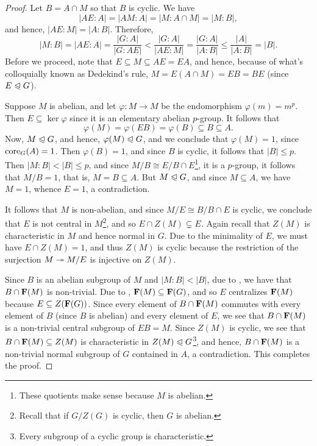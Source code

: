 \begin{proof}
    Let $B = A\cap M$ so that $B$ is cyclic. We have 
    \begin{equation*}
        |AE : A| = |AM : A| = |M : A\cap M| = |M : B|,
    \end{equation*}
    and hence, $|AE : M| = |A : B|$. Therefore, 
    \begin{equation*}
        |M : B| = |AE : A| = \frac{|G : A|}{|G : AE|} < \frac{|G : A|}{|AE : M|} = \frac{|G : A|}{|A : B|}\le\frac{|A|}{|A : B|} = |B|.
    \end{equation*}
    Before we proceed, note that $E\subseteq M\subseteq AE = EA$, and hence, because of what's colloquially known as Dedekind's rule, $M = E(A\cap M) = EB = BE$ (since $E\trianglelefteqslant G$).

    Suppose $M$ is abelian, and let $\varphi: M\to M$ be the endomorphism $\varphi(m) = m^p$. Then $E\subseteq\ker\varphi$ since it is an elementary abelian $p$-group. It follows that 
    \begin{equation*}
        \varphi(M) = \varphi(EB) = \varphi(B)\subseteq B\subseteq A.
    \end{equation*}
    Now, $M\trianglelefteqslant G$, and hence, $\varphi(M)\trianglelefteqslant G$, and we conclude that $\varphi(M) = 1$, since $\operatorname{core}_G(A) = 1$. Then $\varphi(B) = 1$, and since $B$ is cyclic, it follows that $|B|\le p$. Then $|M : B| < |B|\le p$, and since $M/B\cong E/B\cap E$\footnote{These quotients make sense because $M$ is abelian.}, it is a $p$-group, it follows that $M/B = 1$, that is, $M = B\subseteq A$. But $M\trianglelefteqslant G$, and since $M\subseteq A$, we have $M = 1$, whence $E = 1$, a contradiction.

    It follows that $M$ is non-abelian, and since $M/E\cong B/B\cap E$ is cyclic, we conclude that $E$ is not central in $M$\footnote{Recall that if $G/Z(G)$ is cyclic, then $G$ is abelian.}, and so $E\cap Z(M)\subsetneq E$. Again recall that $Z(M)$ is characteristic in $M$ and hence normal in $G$. Due to the minimality of $E$, we must have $E\cap Z(M) = 1$, and thus $Z(M)$ is cyclic because the restriction of the surjection $M\twoheadrightarrow M/E$ is injective on $Z(M)$.

    Since $B$ is an abelian subgroup of $M$ and $|M : B| < |B|$, due to , we have that $B\cap\mathbf{F}(M)$ is non-trivial. Due to , $\mathbf{F}(M)\subseteq\mathbf{F}(G)$, and so $E$ centralizes $\mathbf{F}(M)$ because $E\subseteq Z(\mathbf{F}(G))$. Since every element of $B\cap \mathbf{F}(M)$ commutes with every element of $B$ (since $B$ is abelian) and every element of $E$, we see that $B\cap \mathbf{F}(M)$ is a non-trivial central subgroup of $EB = M$. Since $Z(M)$ is cyclic, we see that $B\cap\mathbf{F}(M)\subseteq Z(M)$ is characteristic in $Z(M)\trianglelefteqslant G$\footnote{Every subgroup of a cyclic group is characteristic.}, and hence, $B\cap\mathbf{F}(M)$ is a non-trivial normal subgroup of $G$ contained in $A$, a contradiction. This completes the proof.
\end{proof}

